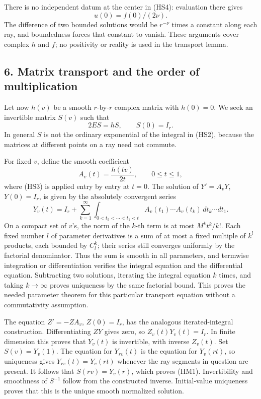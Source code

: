 \documentclass[
  11pt,
]{article}
\begin{document}
There is no independent datum at the center in (HS4): evaluation there
gives \[
                            u(0)=f(0)/(2\nu).                   \tag{HS8}
\] The difference of two bounded solutions would be \(r^{-\nu}\) times a
constant along each ray, and boundedness forces that constant to vanish.
These arguments cover complex \(h\) and \(f\); no positivity or reality
is used in the transport lemma.

\subsection{6. Matrix transport and the order of
multiplication}\label{matrix-transport-and-the-order-of-multiplication}

Let now \(h(v)\) be a smooth \(r\)-by-\(r\) complex matrix with
\(h(0)=0\). We seek an invertible matrix \(S(v)\) such that \[
                             2ES=hS,\qquad S(0)=I_r.           \tag{HM1}
\] In general \(S\) is not the ordinary exponential of the integral in
(HS2), because the matrices at different points on a ray need not
commute.

For fixed \(v\), define the smooth coefficient \[
                   A_v(t)=\frac{h(tv)}{2t},\qquad0\leq t\leq1,
                                                                    \tag{HM2}
\] where (HS3) is applied entry by entry at \(t=0\). The solution of
\(Y'=A_vY\), \(Y(0)=I_r\), is given by the absolutely convergent series
\[
 Y_v(t)=I_r+\sum_{k=1}^{\infty}
  \int_{0<t_k<\cdots<t_1<t}
          A_v(t_1)\cdots A_v(t_k)\,dt_k\cdots dt_1.             \tag{HM3}
\] On a compact set of \(v\)'s, the norm of the \(k\)-th term is at most
\(M^kt^k/k!\). Each fixed number \(l\) of parameter derivatives is a sum
of at most a fixed multiple of \(k^l\) products, each bounded by
\(C_l^k\); their series still converges uniformly by the factorial
denominator. Thus the sum is smooth in all parameters, and termwise
integration or differentiation verifies the integral equation and the
differential equation. Subtracting two solutions, iterating the integral
equation \(k\) times, and taking \(k\to\infty\) proves uniqueness by the
same factorial bound. This proves the needed parameter theorem for this
particular transport equation without a commutativity assumption.

The equation \(Z'=-ZA_v\), \(Z(0)=I_r\), has the analogous
iterated-integral construction. Differentiating \(ZY\) gives zero, so
\(Z_v(t)Y_v(t)=I_r\). In finite dimension this proves that \(Y_v(t)\) is
invertible, with inverse \(Z_v(t)\). Set \(S(v)=Y_v(1)\). The equation
for \(Y_{rv}(t)\) is the equation for \(Y_v(rt)\), so uniqueness gives
\(Y_{rv}(t)=Y_v(rt)\) whenever the ray segments in question are present.
It follows that \(S(rv)=Y_v(r)\), which proves (HM1). Invertibility and
smoothness of \(S^{-1}\) follow from the constructed inverse.
Initial-value uniqueness proves that this is the unique smooth
normalized solution.
\end{document}
